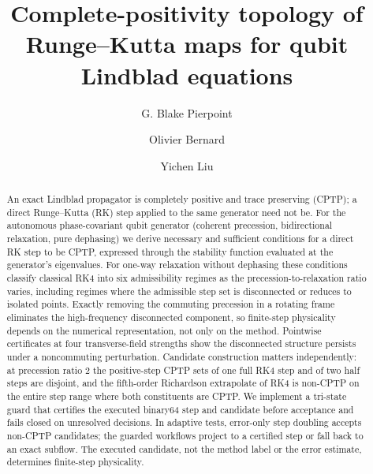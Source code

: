
\begin{frontmatter}

\title{Complete-positivity topology of Runge--Kutta maps for qubit Lindblad equations}

\author[odu]{G. Blake Pierpoint}
\author[uga,weyl]{Olivier Bernard}
\author[sjtu,weyl]{Yichen Liu}


\begin{abstract}
An exact Lindblad propagator is completely positive and trace preserving (CPTP); a direct Runge--Kutta (RK) step applied to the same generator need not be. For the autonomous phase-covariant qubit generator (coherent precession, bidirectional relaxation, pure dephasing) we derive necessary and sufficient conditions for a direct RK step to be CPTP, expressed through the stability function evaluated at the generator's eigenvalues. For one-way relaxation without dephasing these conditions classify classical RK4 into six admissibility regimes as the precession-to-relaxation ratio varies, including regimes where the admissible step set is disconnected or reduces to isolated points. Exactly removing the commuting precession in a rotating frame eliminates the high-frequency disconnected component, so finite-step physicality depends on the numerical representation, not only on the method. Pointwise certificates at four transverse-field strengths show the disconnected structure persists under a noncommuting perturbation. Candidate construction matters independently: at precession ratio 2 the positive-step CPTP sets of one full RK4 step and of two half steps are disjoint, and the fifth-order Richardson extrapolate of RK4 is non-CPTP on the entire step range where both constituents are CPTP. We implement a tri-state guard that certifies the executed binary64 step and candidate before acceptance and fails closed on unresolved decisions. In adaptive tests, error-only step doubling accepts non-CPTP candidates; the guarded workflows project to a certified step or fall back to an exact subflow. The executed candidate, not the method label or the error estimate, determines finite-step physicality.
\end{abstract}


\end{frontmatter}
